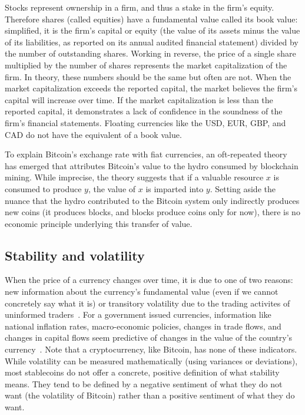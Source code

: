 Stocks represent ownership in a firm, and thus a stake in the firm's equity. Therefore shares (called equities) have a fundamental value called its book value: simplified, it is the firm's capital or equity (the value of its assets minus the value of its liabilities, as reported on its annual audited financial statement) divided by the number of outstanding shares. Working in reverse, the price of a single share multiplied by the number of shares represents the market capitalization of the firm. In theory, these numbers should be the same but often are not. When the market capitalization exceeds the reported capital, the market believes the firm's capital will increase over time. If the market capitalization is less than the reported capital, it demonstrates a lack of confidence in the soundness of the firm's financial statements. Floating currencies like the USD, EUR, GBP, and CAD do not have the equivalent of a book value.

To explain Bitcoin's exchange rate with fiat currencies, an oft-repeated theory has emerged that attributes Bitcoin's value to the hydro consumed by blockchain mining. While imprecise, the theory suggests that if a valuable resource $x$ is consumed to produce $y$, the value of $x$ is imparted into $y$. Setting aside the nuance that the hydro contributed to the Bitcoin system only indirectly produces new coins (it produces blocks, and blocks produce coins only for now), there is no economic principle underlying this transfer of value.



\subsection{Stability and volatility}

When the price of a currency changes over time, it is due to one of two reasons: new information about the currency's fundamental value (even if we cannot concretely say what it is) or transitory volatility due to the trading activites of uninformed traders~\cite{harris2003trading}. For a government issued currencies, information like national inflation rates, macro-economic policies, changes in trade flows, and changes in capital flows seem predictive of changes in the value of the country's currency~\cite{harris2003trading}. Note that a cryptocurrency, like Bitcoin, has none of these indicators. While volatility can be measured mathematically (using variances or deviations), most stablecoins do not offer a concrete, positive definition of what stability means. They tend to be defined by a negative sentiment of what they do not want (the volatility of Bitcoin) rather than a positive sentiment of what they do want.

